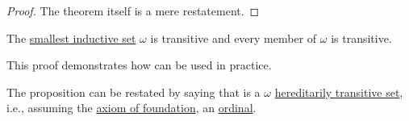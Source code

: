 \begin{proof}
  The theorem itself is a mere restatement.
\end{proof}

\begin{proposition}\label{thm:omega_is_hereditarily_transitive}
  The \hyperref[def:smallest_inductive_set]{smallest inductive set} \( \omega \) is transitive and every member of \( \omega \) is transitive.
\end{proposition}
\begin{comments}
  \item This proof demonstrates how  can be used in practice.

  \item The proposition can be restated by saying that is a \( \omega \) \hyperref[def:hereditarily_transitive_set]{hereditarily transitive set}, i.e., assuming the \hyperref[def:zfc/foundation]{axiom of foundation}, an \hyperref[def:ordinal]{ordinal}.
\end{comments}
